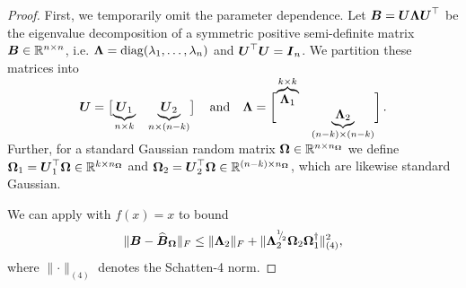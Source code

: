 \begin{proof}
    First, we temporarily omit the parameter dependence. Let $\boldsymbol{B} = \boldsymbol{U} \boldsymbol{\Lambda} \boldsymbol{U}^{\top}$ be the eigenvalue decomposition of a symmetric positive semi-definite matrix $\boldsymbol{B} \in \mathbb{R}^{n \times n}$, i.e. $\boldsymbol{\Lambda} = \operatorname{diag}(\lambda_1, \dots, \lambda_n)$ and $\boldsymbol{U}^{\top} \boldsymbol{U}= \boldsymbol{I}_n$. We partition these matrices into
    \begin{equation}
        \rule[\dimexpr-2ex-\ht\strutbox]{0pt}{\dimexpr2ex+4ex+\baselineskip}
        \mtx{U} = \begin{bmatrix}
            \smash{\underbrace{\mtx{U}_1}_{n \times k}} & \smash{\underbrace{\mtx{U}_2}_{n \times (n-k)}}
        \end{bmatrix}
        \quad \text{and} \quad
        \mtx{\Lambda} =
        \begin{bmatrix}
            \smash{\overbrace{\mtx{\Lambda}_1}^{k \times k}} & \\ & \smash{\underbrace{\mtx{\Lambda}_2}_{(n-k) \times (n-k)}}
        \end{bmatrix}.
    \end{equation}
    Further, for a standard Gaussian random matrix $\boldsymbol{\Omega} \in \mathbb{R}^{n \times n_{\boldsymbol{\Omega}}}$ we define $\boldsymbol{\Omega}_1 = \boldsymbol{U}_1^{\top} \boldsymbol{\Omega} \in \mathbb{R}^{k \times n_{\boldsymbol{\Omega}}}$ and $\boldsymbol{\Omega}_2 = \boldsymbol{U}_2^{\top} \boldsymbol{\Omega} \in \mathbb{R}^{(n - k) \times n_{\boldsymbol{\Omega}}}$, which are likewise standard Gaussian.

    We can apply \cite[Theorem B.1]{persson-2023-randomized-lowrank} with $f(x) = x$ to bound
    \begin{equation}
        \lVert \boldsymbol{B} - \widehat{\boldsymbol{B}}_{\boldsymbol{\Omega}} \rVert _F 
        \leq  \lVert \boldsymbol{\Lambda}_2 \rVert _F + \lVert \boldsymbol{\Lambda}_2^{{}^{1}{\mskip -5mu/\mskip -3mu}_{2}} \boldsymbol{\Omega}_2 \boldsymbol{\Omega}_1^{\dagger} \rVert _{(4)}^2,
        \label{equ:nystrom-proof-persson-bonud}
    \end{equation}
    where $\lVert \cdot \rVert _{(4)}$ denotes the Schatten-4 norm.
    

\end{proof}

